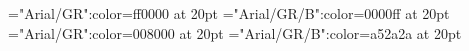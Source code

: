 \documentclass[a4paper]{article}
\begin{document}
\pagestyle{plain}
\sloppy
\setlength{\parfillskip}{0pt plus 1fil}
\font\ta="Arial/GR":color=ff0000 at 20pt
\font\tbta="Arial/GR/B":color=0000ff at 20pt
\font\tctbta="Arial/GR":color=008000 at 20pt
\font\tdtbta="Arial/GR/B":color=a52a2a at 20pt

\mbox{} 
\newpage 
\newpage 
\setcounter{page}{1} 
\pagestyle{fancy} 






\end{document}
